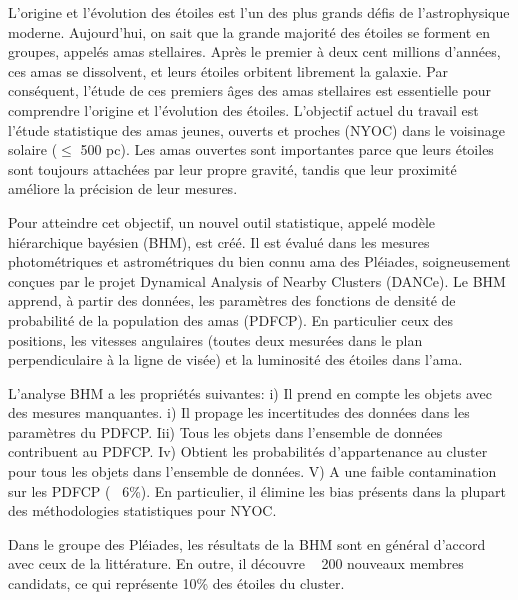 


L'origine et l'évolution des étoiles est l'un des plus grands défis de l'astrophysique moderne. Aujourd'hui, on sait que la grande majorité des étoiles se forment en groupes, appelés amas stellaires. Après le premier à deux cent millions d'années, ces amas se dissolvent, et leurs étoiles orbitent librement la galaxie. Par conséquent, l'étude de ces premiers âges des amas stellaires est essentielle pour comprendre l'origine et l'évolution des étoiles.
L'objectif actuel du travail est l'étude statistique des amas jeunes, ouverts et proches (NYOC) dans le voisinage solaire ($\leq$ 500 pc). Les amas ouvertes sont importantes parce que leurs étoiles sont toujours attachées par leur propre gravité, tandis que leur proximité améliore la précision de leur mesures.

Pour atteindre cet objectif, un nouvel outil statistique, appelé modèle hiérarchique bayésien (BHM), est créé. Il est évalué dans les mesures photométriques et astrométriques  du bien connu ama des Pléiades, soigneusement conçues par le projet Dynamical Analysis of Nearby Clusters (DANCe).
Le BHM apprend, à partir des données, les paramètres des fonctions de densité de probabilité de la population des amas (PDFCP). En particulier ceux des positions, les vitesses angulaires (toutes deux mesurées dans le plan perpendiculaire à la ligne de visée) et la luminosité des étoiles dans l'ama.

L'analyse BHM a les propriétés suivantes: i) Il prend en compte les objets avec des mesures manquantes. i) Il propage les incertitudes des données dans les paramètres du PDFCP. Iii) Tous les objets dans l'ensemble de données contribuent au PDFCP. Iv) Obtient les probabilités d'appartenance au cluster pour tous les objets dans l'ensemble de données. V) A une faible contamination sur les PDFCP (~ 6\%). En particulier, il élimine les bias présents dans la plupart des méthodologies statistiques pour NYOC.

Dans le groupe des Pléiades, les résultats de la BHM sont en général d'accord avec ceux de la littérature. En outre, il découvre ~ 200 nouveaux membres candidats, ce qui représente 10\% des étoiles du cluster.